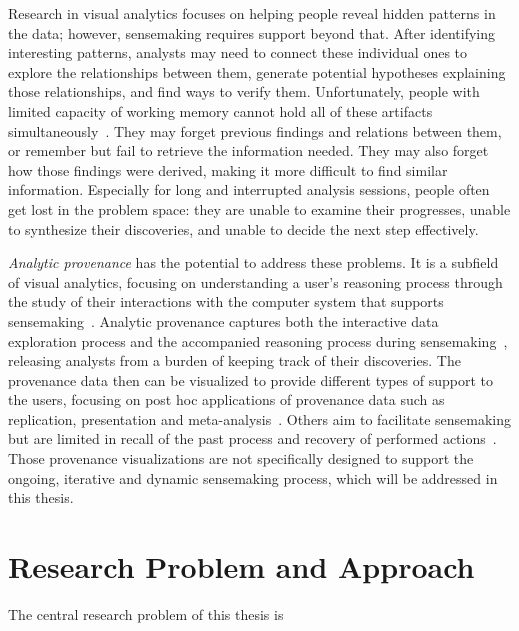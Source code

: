 Research in visual analytics focuses on helping people reveal hidden patterns in the data; however, sensemaking requires support beyond that. After identifying interesting patterns, analysts may need to connect these individual ones to explore the relationships between them, generate potential hypotheses explaining those relationships, and find ways to verify them. Unfortunately, people with limited capacity of working memory cannot hold all of these artifacts simultaneously~\cite{Heuer1999}. They may forget previous findings and relations between them, or remember but fail to retrieve the information needed. They may also forget how those findings were derived, making it more difficult to find similar information. Especially for long and interrupted analysis sessions, people often get lost in the problem space: they are unable to examine their progresses, unable to synthesize their discoveries, and unable to decide the next step effectively.

\emph{Analytic provenance} has the potential to address these problems. It is a subfield of  visual analytics, focusing on understanding a user's reasoning process through the study of their interactions with the computer system that supports sensemaking~\cite{North2011}. Analytic provenance captures both the interactive data exploration process and the accompanied reasoning process during sensemaking~\cite{Xu2015}, releasing analysts from a burden of keeping track of their discoveries. The provenance data then can be visualized to provide different types of support to the users, focusing on post hoc applications of provenance data such as replication, presentation and meta-analysis~\cite{Ragan2016}. Others aim to facilitate sensemaking but are limited in recall of the past process and recovery of performed actions~\cite{Heer2008}. Those provenance visualizations are not specifically designed to support the ongoing, iterative and dynamic sensemaking process, which will be addressed in this thesis.

\section{Research Problem and Approach}

The central research problem of this thesis is
\begin{center}
\end{center}

